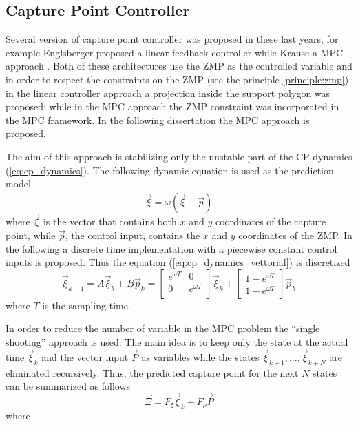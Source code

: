 \subsection{Capture Point Controller}
Several version of capture point controller was proposed in these last years,
for example Englsberger proposed a linear feedback controller \cite{Englsberger2011}
while Krause a MPC approach \cite{Krause2012}.
Both of these architectures use the ZMP as the controlled variable and in order to respect the
constraints on the ZMP (see the principle \ref{principle:zmp}) in the linear controller approach
a projection inside the support polygon was proposed; while in the MPC approach the ZMP constraint
was incorporated in the MPC framework.
In the following dissertation the MPC approach is proposed.
\par
The aim of this approach is stabilizing only the unstable part of the CP dynamics
(\ref{eq:cp_dynamics}). The following dynamic equation is used as the prediction model
\begin{equation}
  \label{eq:cp_dynamics_vettorial}
  \dot{\vec{\xi}} = \omega(\vec{\xi} - \vec{p})
\end{equation}
where $\vec{\xi}$ is the vector that contains both $x$ and $y$ coordinates of the capture point,
while $\vec{p}$, the control input, contains the  $x$ and $y$ coordinates of the ZMP.
In the following a discrete time implementation with a piecewise constant control inputs is
proposed. Thus the equation (\ref{eq:cp_dynamics_vettorial}) is discretized
\[
\vec{\xi}_{k+1} = A \vec{\xi}_{k} + B \vec{p}_{k} =
\begin{bmatrix}
  e^{\omega T} & 0 \\
  0 & e^{\omega T} \\
\end{bmatrix}
\vec{\xi}_{k} +
\begin{bmatrix}
  1-e^{\omega T} \\
  1-e^{\omega T}
\end{bmatrix}
\vec{p}_{k} 
\]
where $T$ is the sampling time.
\par
In order to reduce the number of variable in the MPC problem the
``single shooting'' approach is used. The main idea is to keep only the state at the actual time
$\vec{\xi}_k$ and the vector input $\vec{P}$ as variables
while the states $\vec{\xi}_{k + 1}, \dots, \vec{\xi}_{k + N}$ are eliminated recursively.
Thus, the predicted capture point for the next $N$ states can be summarized as follows
\[
\vec{\Xi} = F_{\xi} \vec{\xi}_k + F_{p} \vec{P}
\]
where

